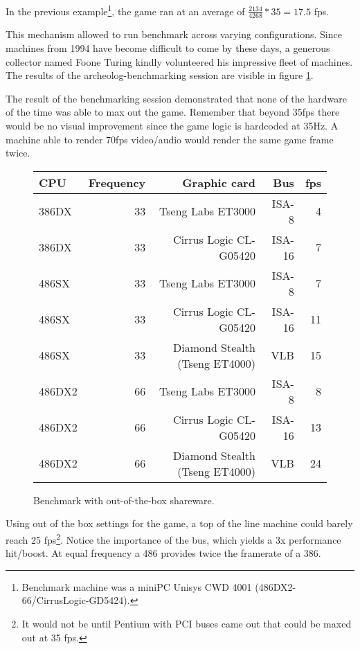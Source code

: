  \par
In the previous example\footnote{Benchmark machine was a miniPC Unisys CWD 4001 (486DX2-66/CirrusLogic-GD5424).}, the game ran at an average of $\frac{2134}{4268}*35 = 17.5$ fps. \\
\par
This mechanism allowed to run benchmark across varying configurations. Since machines from 1994 have become difficult to come by these days, a generous collector named Foone Turing kindly volunteered his impressive fleet of machines. The results of the archeolog-benchmarking session are visible in figure \ref{bnechmarsks}.\\
\par
 The result of the benchmarking session demonstrated that none of the hardware of the time was able to max out the game. Remember that beyond 35fps there would be no visual improvement since the game logic is hardcoded at 35Hz. A machine able to render 70fps video/audio would render the same game frame twice.\\
\par
\begin{figure}[H]
\centering  
\begin{tabularx}{\textwidth}{ L{1}  R{0.3} R{2.4} R{1} R{0.3} }
  \toprule
   \textbf{CPU} & \textbf{Frequency} & \textbf{Graphic card} & \textbf{Bus} & \textbf{fps}\\
  \toprule 
  386DX & 33 & Tseng Labs ET3000    & ISA-8  &  4\\
  386DX\protect\footnotemark & 33 & Cirrus Logic CL-G05420 & ISA-16 &  7\\
  \toprule 
  486SX & 33 & Tseng Labs ET3000                & ISA-8  &  7\\
  486SX & 33 & Cirrus Logic CL-G05420           & ISA-16 & 11\\ 
  486SX & 33 & Diamond Stealth (Tseng ET4000)   & VLB    & 15\\
  \toprule 
  486DX2 & 66 & Tseng Labs ET3000               & ISA-8  &  8\\
  486DX2 & 66 & Cirrus Logic CL-G05420          & ISA-16 & 13\\
  486DX2 & 66 & Diamond Stealth (Tseng ET4000)  & VLB    & 24\\
   \toprule
 \end{tabularx}
\caption{Benchmark with out-of-the-box \doom{} shareware.}
\label{bnechmarsks}
\end{figure}
\par
Using out of the box settings for the game, a top of the line machine could barely reach 25 fps\footnote{It would not be until Pentium with PCI buses came out that \doom{} could be maxed out at 35 fps.}. Notice the importance of the bus, which yields a 3x performance hit/boost. At equal frequency a 486 provides twice the framerate of a 386.\\
\par







